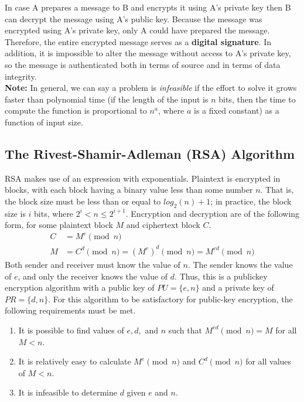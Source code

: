 \documentclass{article}
\begin{document}
In case A prepares a message to B and encrypts it using A's private key then B can decrypt the message using A's public key. Because the
message was encrypted using A's private key, only A could have prepared the message.
Therefore, the entire encrypted message serves as a {\bf digital signature}. In addition,
it is impossible to alter the message without access to A's private key, so the
message is authenticated both in terms of source and in terms of data integrity.\\

{\bf Note:} In general, we can say a problem is {\it infeasible} if the effort to solve it grows
faster than polynomial time (if the length of the input is $n$ bits, then the
time to compute the function is proportional to $n^a$, where $a$ is a fixed constant) as a function of input size.

\subsection{The Rivest-Shamir-Adleman (RSA) Algorithm}
RSA makes use of an expression with exponentials. Plaintext is encrypted in blocks,
with each block having a binary value less than some number $n$. That is, the block
size must be less than or equal to $log_2(n) + 1$; in practice, the block size is $i$ bits,
where $2^i < n \leq 2^{i+1}$. Encryption and decryption are of the following form, for
some plaintext block $M$ and ciphertext block $C$.
\begin{align}
    C &= M^e \pmod n\\
    M &= C^d \pmod n = (M^e)^d \pmod n = M^{ed} \pmod n
\end{align}
Both sender and receiver must know the value of $n$. The sender knows
the value of $e$, and only the receiver knows the value of $d$. Thus, this is a publickey
encryption algorithm with a public key of $PU = \{e, n\}$ and a private key of
$PR = \{d, n\}$. For this algorithm to be satisfactory for public-key encryption, the following
requirements must be met.
\begin{enumerate}
    \item  It is possible to find values of $e, d,$ and $n$ such that $M^{ed} \pmod n = M$ for all $M < n$.
    \item  It is relatively easy to calculate $M^e \pmod n$ and $C^d \pmod n$ for all values of $M < n$.
    \item  It is infeasible to determine $d$ given $e$ and $n$.
\end{enumerate}
\end{document}
